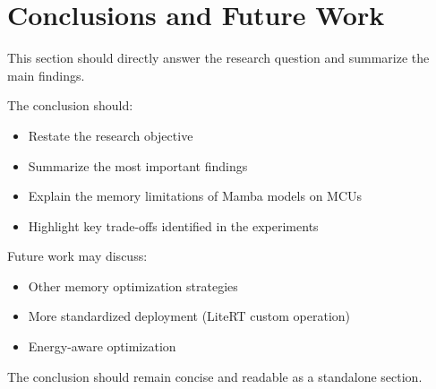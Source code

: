 \section{Conclusions and Future Work}

This section should directly answer the research question and summarize the main findings.

The conclusion should:
\begin{itemize}
  \item Restate the research objective
  \item Summarize the most important findings
  \item Explain the memory limitations of Mamba models on MCUs
  \item Highlight key trade-offs identified in the experiments
\end{itemize}

Future work may discuss:
\begin{itemize}
  \item Other memory optimization strategies
  \item More standardized deployment (LiteRT custom operation)
  \item Energy-aware optimization
\end{itemize}

The conclusion should remain concise and readable as a standalone section.
